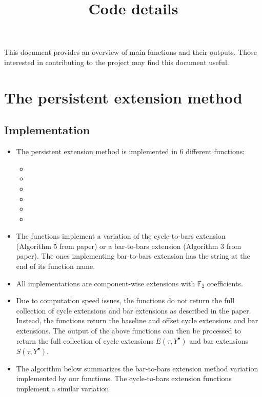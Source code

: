 \documentclass{article}
\title{Code details}
\date{}
\begin{document}
\maketitle
This document provides an overview of main functions and their outputs. Those interested in contributing to the project may find this document useful.

\section{The persistent extension method}
\subsection{Implementation}
\begin{itemize}
\item The persistent extension method is implemented in 6 different functions:	
	\begin{itemize}
	\item {}
	\item {}
	\item {}
	\item {}
	\item {}
	\item {}
	\end{itemize}
\item The functions implement a variation of the cycle-to-bars extension (Algorithm 5 from paper) or a bar-to-bars extension (Algorithm 3 from paper). The ones implementing bar-to-bars extension has the string  at the end of its function name.
\item All implementations are component-wise extensions with $\mathbb{F}_2$ coefficients.
\item Due to computation speed issues, the functions do not return the full collection of cycle extensions and bar extensions as described in the paper. Instead, the functions return the baseline and offset cycle extensions and bar extensions. The output of the above functions can then be processed to return the full collection of cycle extensions $E(\tau, Y^{\bullet})$ and bar extensions $S(\tau, Y^{\bullet})$.  
\item The algorithm below summarizes the bar-to-bars extension method variation implemented by our functions. The cycle-to-bars extension functions implement a similar variation. 
\end{itemize}
\end{document}
